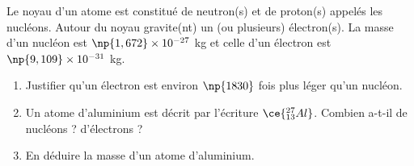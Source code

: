 \documentclass[a4paper]{article}
\begin{document}
\bigskip

\exo Le noyau d'un atome est constitué de neutron(s) et de proton(s) appelés les nucléons. Autour du noyau gravite(nt) un (ou plusieurs) électron(s). La masse d'un nucléon est $\np{1,672}\times10^{-27}$ kg et celle d'un électron est $\np{9,109}\times10^{-31}$ kg.

\begin{enumerate}
  \item Justifier qu'un électron est environ $\np{1830}$ fois plus léger qu'un nucléon.
  \item Un atome d'aluminium est décrit par l'écriture $\ce{^{27}_{13}Al}$. Combien a-t-il de nucléons ? d'électrons ?
  \item En déduire la masse d'un atome d'aluminium.
\end{enumerate}
\end{document}
